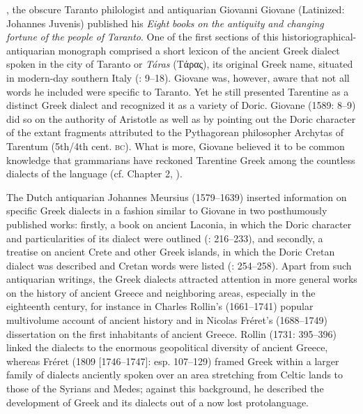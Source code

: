 \citealt{In1589}, the obscure Taranto philologist and antiquarian Giovanni Giovane (Latinized: Johannes Juvenis) published his \textit{Eight} \textit{books} \textit{on} \textit{the} \textit{antiquity} \textit{and} \textit{changing} \textit{fortune} \textit{of} \textit{the} \textit{people} \textit{of} \textit{Taranto}. One of the first sections of this historiographical-antiquarian monograph comprised a short lexicon of the ancient Greek dialect spoken in the city of Taranto or \textit{Táras} (Tάρας), its original Greek name, situated in modern-day southern Italy (\citealt{Giovane1589}: 9–18). Giovane was, however, aware that not all words he included were specific to Taranto. Yet he still presented Tarentine as a distinct Greek dialect and recognized it as a variety of Doric. Giovane (1589: 8–9) did so on the authority of Aristotle as well as by pointing out the Doric character of the extant fragments attributed to the Pythagorean philosopher Archytas of Tarentum (5th/4th cent. \textsc{bc}). What is more, Giovane believed it to be common knowledge that grammarians have reckoned Tarentine Greek among the countless dialects of the language (cf. Chapter 2, ).

The Dutch antiquarian Johannes Meursius (1579–1639) inserted information on specific Greek dialects in a fashion similar to Giovane in two posthumously published works: firstly, a book on ancient Laconia, in which the Doric character and particularities of its dialect were outlined (\citealt{Meursius1661}: 216–233), and secondly, a treatise on ancient Crete and other Greek islands, in which the Doric Cretan dialect was described and Cretan words were listed (\citealt{Meursius1675}: 254–258). Apart from such antiquarian writings, the Greek dialects attracted attention in more general works on the history of ancient Greece and neighboring areas, especially in the eighteenth century, for instance in Charles Rollin’s (1661–1741) popular multivolume account of ancient history and in Nicolas Fréret’s (1688–1749) dissertation on the first inhabitants of ancient Greece. Rollin (1731: 395–396) linked the dialects to the enormous geopolitical diversity of ancient Greece, whereas Fréret (1809 [1746–1747]: esp. 107–129) framed Greek within a larger family of dialects anciently spoken over an area stretching from Celtic lands to those of the Syrians and Medes; against this background, he described the development of Greek and its dialects out of a now lost protolanguage.

